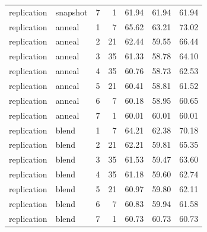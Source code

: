 \begin{tabular}{llrrrrr}
replication & snapshot & 7 & 1 & 61.94 & 61.94 & 61.94 \\
replication & anneal & 1 & 7 & 65.62 & 63.21 & 73.02 \\
replication & anneal & 2 & 21 & 62.44 & 59.55 & 66.44 \\
replication & anneal & 3 & 35 & 61.33 & 58.78 & 64.10 \\
replication & anneal & 4 & 35 & 60.76 & 58.73 & 62.53 \\
replication & anneal & 5 & 21 & 60.41 & 58.81 & 61.52 \\
replication & anneal & 6 & 7 & 60.18 & 58.95 & 60.65 \\
replication & anneal & 7 & 1 & 60.01 & 60.01 & 60.01 \\
replication & blend & 1 & 7 & 64.21 & 62.38 & 70.18 \\
replication & blend & 2 & 21 & 62.21 & 59.81 & 65.35 \\
replication & blend & 3 & 35 & 61.53 & 59.47 & 63.60 \\
replication & blend & 4 & 35 & 61.18 & 59.60 & 62.74 \\
replication & blend & 5 & 21 & 60.97 & 59.80 & 62.11 \\
replication & blend & 6 & 7 & 60.83 & 59.94 & 61.58 \\
replication & blend & 7 & 1 & 60.73 & 60.73 & 60.73 \\
\bottomrule
\end{tabular}
